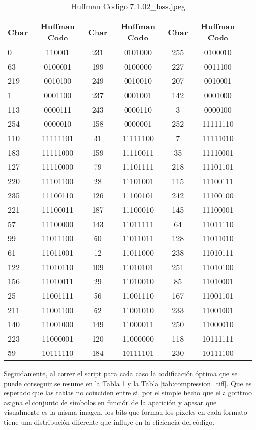 \documentclass[conference,onecolumn,12pt]{IEEEtran}
\numberwithin{equation}{subsection}
\begin{document}
\begin{table}
\centering
\caption{Huffman Codigo 7.1.02_loss.jpeg}
\label{tab:compression_jpeg}
\begin{tabular}{lcccccc}
\hline
Char & Huffman Code & Char & Huffman Code & Char & Huffman Code \\
\hline
0 & 110001 & 231 & 0101000 & 255 & 0100010 \\
63 & 0100001 & 199 & 0100000 & 227 & 0011100 \\
219 & 0010100 & 249 & 0010010 & 207 & 0010001 \\
1 & 0001100 & 237 & 0001001 & 142 & 0001000 \\
113 & 0000111 & 243 & 0000110 & 3 & 0000100 \\
254 & 0000010 & 158 & 0000001 & 252 & 11111110 \\
110 & 11111101 & 31 & 11111100 & 7 & 11111010 \\
183 & 11111000 & 159 & 11110011 & 35 & 11110001 \\
127 & 11110000 & 79 & 11101111 & 218 & 11101101 \\
220 & 11101100 & 28 & 11101001 & 115 & 11100111 \\
235 & 11100110 & 126 & 11100101 & 242 & 11100100 \\
221 & 11100011 & 187 & 11100010 & 145 & 11100001 \\
57 & 11100000 & 143 & 11011111 & 64 & 11011110 \\
99 & 11011100 & 60 & 11011011 & 128 & 11011010 \\
61 & 11011001 & 12 & 11011000 & 238 & 11010111 \\
122 & 11010110 & 109 & 11010101 & 251 & 11010100 \\
156 & 11010011 & 29 & 11010010 & 85 & 11010001 \\
25 & 11001111 & 56 & 11001110 & 167 & 11001101 \\
211 & 11001100 & 62 & 11001010 & 233 & 11001001 \\
140 & 11001000 & 149 & 11000011 & 250 & 11000010 \\
223 & 11000001 & 120 & 11000000 & 118 & 10111111 \\
59 & 10111110 & 184 & 10111101 & 230 & 10111100 \\
\hline
\end{tabular}
\end{table}

Seguidamente, al correr el script para cada caso la codificación óptima que se puede conseguir se resume en la Tabla \ref{tab:compression_jpeg} y la Tabla \ref{tab:compression_tiff}. Que es esperado que las tablas no coinciden entre sí, por el simple hecho que el algoritmo asigna el conjunto de símbolos en función de la aparición y apesar que visualmente es la misma imagen, los bits que forman los píxeles en cada formato tiene una distribución diferente que influye en la eficiencia del código.
\end{document}
